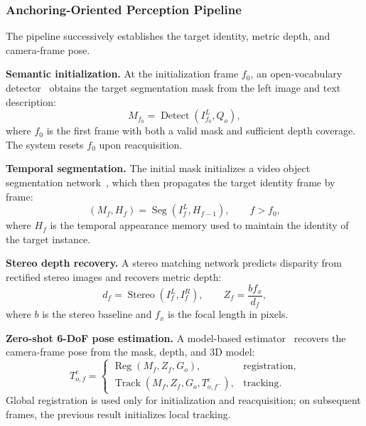 \documentclass[review]{vgtc}
\begin{document}
\subsubsection{Anchoring-Oriented Perception Pipeline}

The pipeline successively establishes the target identity, metric depth, and camera-frame pose.

\textbf{Semantic initialization.}
At the initialization frame $f_0$, an open-vocabulary detector~\cite{yoloe2025} obtains the target segmentation mask from the left image and text description:
\begin{equation}
M_{f_0} = \operatorname{Detect}(I_{f_0}^{L}, Q_o),
\label{eq:detect}
\end{equation}
where $f_0$ is the first frame with both a valid mask and sufficient depth coverage. The system resets $f_0$ upon reacquisition.

\textbf{Temporal segmentation.}
The initial mask initializes a video object segmentation network~\cite{cutie2024}, which then propagates the target identity frame by frame:
\begin{equation}
(M_f, H_f) = \operatorname{Seg}(I_f^{L}, H_{f-1}), \qquad f > f_0,
\label{eq:seg}
\end{equation}
where $H_f$ is the temporal appearance memory used to maintain the identity of the target instance.

\textbf{Stereo depth recovery.}
A stereo matching network predicts disparity from rectified stereo images and recovers metric depth:
\begin{equation}
d_f = \operatorname{Stereo}(I_f^{L}, I_f^{R}), \qquad Z_f = \frac{b f_x}{d_f},
\label{eq:depth}
\end{equation}
where $b$ is the stereo baseline and $f_x$ is the focal length in pixels.

\textbf{Zero-shot 6-DoF pose estimation.}
A model-based estimator~\cite{foundationpose2024} recovers the camera-frame pose from the mask, depth, and 3D model:
\begin{equation}
T_{o,f}^{c} =
\begin{cases}
\operatorname{Reg}(M_f, Z_f, G_o), & \text{registration}, \\
\operatorname{Track}(M_f, Z_f, G_o, T_{o,f^-}^{c}), & \text{tracking}.
\end{cases}
\label{eq:pose}
\end{equation}
Global registration is used only for initialization and reacquisition; on subsequent frames, the previous result initializes local tracking.
\end{document}
